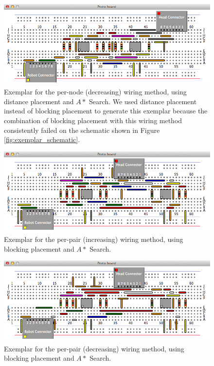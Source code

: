 \begin{figure}[H]
\begin{center}
\includegraphics[width=\textwidth]{Images/exemplar_per_node_decreasing.png}
\caption[Per-node (decreasing) method exemplar]{Exemplar for the per-node
(decreasing) wiring method, using distance placement and $A*$ Search. We used
distance placement instead of blocking placement to generate this
exemplar because the combination of blocking placement with this wiring
method consistently failed on the schematic shown in Figure
\ref{fig:exemplar_schematic}.}
\end{center}
\end{figure}

\begin{figure}[H]
\begin{center}
\includegraphics[width=\textwidth]{Images/exemplar_per_pair_increasing.png}
\caption[Per-pair (increasing) method exemplar]{Exemplar for the per-pair
(increasing) wiring method, using blocking placement and $A*$ Search.}
\end{center}
\end{figure}

\begin{figure}[H]
\begin{center}
\includegraphics[width=\textwidth]{Images/exemplar_per_pair_decreasing.png}
\caption[Per-pair (decreasing) method exemplar]{Exemplar for the per-pair
(decreasing) wiring method, using blocking placement and $A*$ Search.}
\end{center}
\end{figure}

